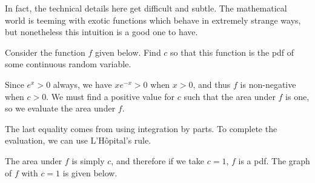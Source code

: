 \rmk In fact, the technical details here get difficult and subtle. The mathematical world is teeming with exotic functions which behave in extremely strange ways, but nonetheless this intuition is a good one to have.

\begin{examp}Consider the function $f$ given below. Find $c$ so that this function is the pdf of some continuous random variable.
\renewcommand*{\arraystretch}{1.35}
\renewcommand*{\arraystretch}{1}
\par
\noindent Since $e^{x}>0$ always, we have $xe^{-x} > 0$ when $x > 0$, and thus $f$ is non-negative when $c > 0$. We must find a positive value for $c$ such that the area under $f$ is one, so we evaluate the area under $f$.
\par
\noindent The last equality comes from using integration by parts. To complete the evaluation, we can use L'H\^{o}pital's rule.
\par
\noindent The area under $f$ is simply $c$, and therefore if we take $c=1$, $f$ is a pdf. The graph of $f$ with $c = 1$ is given below.
\begin{center}
\end{center}
\end{examp}

